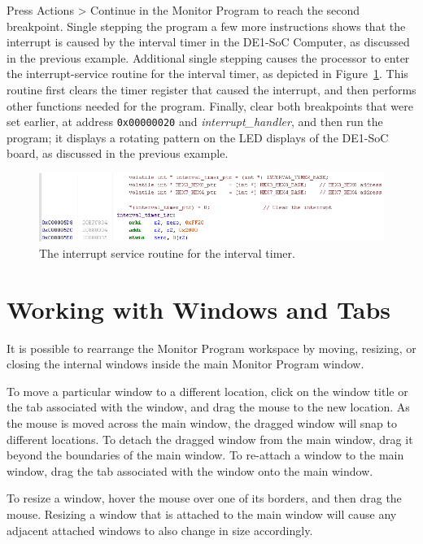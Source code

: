 \documentclass[11pt, twoside, pdftex]{article}
\begin{document}
\newpage
Press {\sf Actions > Continue} in the Monitor Program to reach
the second breakpoint. Single stepping the program a few more
instructions shows that the interrupt is caused by the interval
timer in the DE1-SoC Computer, as discussed in the previous
example. Additional single stepping causes the processor to enter
the interrupt-service routine for the interval timer,
as depicted in Figure~\ref{fig:36}. This routine first clears the timer
register that caused the interrupt, and then performs other
functions needed for the program.
Finally, clear both breakpoints that were set earlier, at address
\texttt{0x00000020} and {\it interrupt\_handler}, and then run
the program; it displays a rotating pattern on the LED displays
of the DE1-SoC board, as discussed in the previous example.


\begin{figure}[H]
   \begin{center}
      \includegraphics[scale=0.7]{screenshots/figure36.png}
   \end{center}
   \caption{The interrupt service routine for the interval timer.} 
	 \label{fig:36}
\end{figure}

\section{Working with Windows and Tabs}

It is possible to rearrange the Monitor Program workspace by
moving, resizing, or closing the internal windows inside the main
Monitor Program window.

To move a particular window to a different location, click on the
window title or the tab associated with the window, and drag the
mouse to the new location. As the mouse is moved across the main
window, the dragged window will snap to different locations. 
To detach the dragged window from the main window, drag it beyond
the boundaries of the main window. 
To re-attach a window to the main window, drag the tab associated
with the window onto the main window.

To resize a window, hover the mouse over one of its borders, and
then drag the mouse. Resizing a window that is attached to the
main window will cause any adjacent attached windows to also
change in size accordingly.
\end{document}
